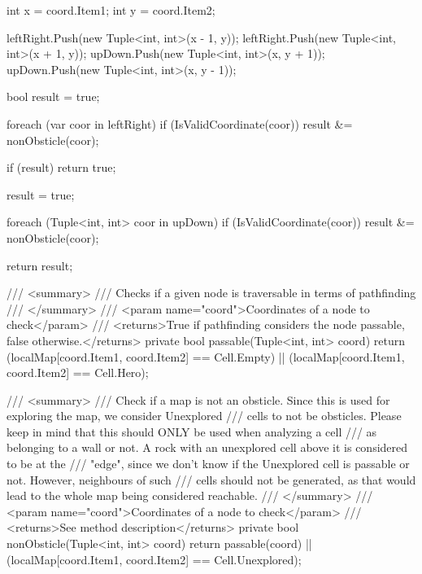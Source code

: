 \documentclass[11pt]{article}
\begin{document}
\begin{code}
{{{            int x = coord.Item1;
            int y = coord.Item2;

            leftRight.Push(new Tuple<int, int>(x - 1, y));
            leftRight.Push(new Tuple<int, int>(x + 1, y));
            upDown.Push(new Tuple<int, int>(x, y + 1));
            upDown.Push(new Tuple<int, int>(x, y - 1));

            bool result = true;

            foreach (var coor in leftRight)
            {
                if (IsValidCoordinate(coor))
                {
                    result &= nonObsticle(coor);
                }
            }

            if (result)
            {
                return true;
            }

            result = true;

            foreach (Tuple<int, int> coor in upDown)
            {
                if (IsValidCoordinate(coor))
                {
                    result &= nonObsticle(coor);
                }
            }

            return result;
        }

        /// <summary>
        /// Checks if a given node is traversable in terms of pathfinding
        /// </summary>
        /// <param name="coord">Coordinates of a node to check</param>
        /// <returns>True if pathfinding considers the node passable, false otherwise.</returns>
        private bool passable(Tuple<int, int> coord)
        {
            return (localMap[coord.Item1, coord.Item2] == Cell.Empty)
                || (localMap[coord.Item1, coord.Item2] == Cell.Hero);
        }

        /// <summary>
        /// Check if a map is not an obsticle. Since this is used for exploring the map, we consider Unexplored
        /// cells to not be obsticles. Please keep in mind that this should ONLY be used when analyzing a cell
        /// as belonging to a wall or not. A rock with an unexplored cell above it is considered to be at the
        /// "edge", since we don't know if the Unexplored cell is passable or not. However, neighbours of such
        /// cells should not be generated, as that would lead to the whole map being considered reachable.
        /// </summary>
        /// <param name="coord">Coordinates of a node to check</param>
        /// <returns>See method description</returns>
        private bool nonObsticle(Tuple<int, int> coord)
        {
            return passable(coord) || (localMap[coord.Item1, coord.Item2] == Cell.Unexplored);
        }

}}
\end{code}
\end{document}
